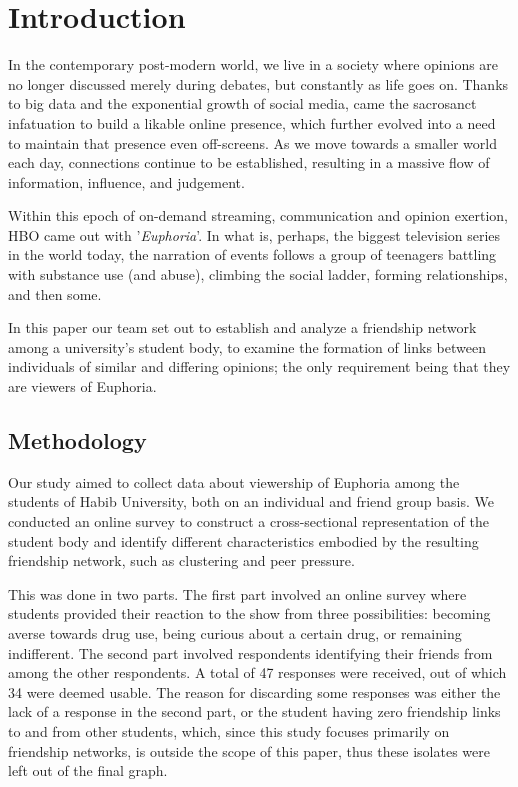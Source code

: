 \documentclass[runningheads]{llncs}
\begin{document}
\section{Introduction}
In the contemporary post-modern world, we live in a society where opinions are no longer discussed merely during debates, but constantly as life goes on. Thanks to big data and the exponential growth of social media, came the sacrosanct infatuation to build a likable online presence, which further evolved into a need to maintain that presence even off-screens. As we move towards a smaller world each day, connections continue to be established, resulting in a massive flow of information, influence, and judgement.

Within this epoch of on-demand streaming, communication and opinion exertion, HBO came out with '\textit{Euphoria}'. In what is, perhaps, the biggest television series in the world today, the narration of events follows a group of teenagers battling with substance use (and abuse), climbing the social ladder, forming relationships, and then some.

In this paper our team set out to establish and analyze a friendship network among a university's student body, to examine the formation of links between individuals of similar and differing opinions; the only requirement being that they are viewers of Euphoria. 

\subsection{Methodology}
Our study aimed to collect data about viewership of Euphoria among the students of Habib University, both on an individual and friend group basis. We conducted an online survey to construct a cross-sectional representation of the student body and identify different characteristics embodied by the resulting friendship network, such as clustering and peer pressure.

This was done in two parts. The first part involved an online survey where students provided their reaction to the show from three possibilities: becoming averse towards drug use, being curious about a certain drug, or remaining indifferent. The second part involved respondents identifying their friends from among the other respondents. A total of 47 responses were received, out of which 34 were deemed usable. The reason for discarding some responses was either the lack of a response in the second part, or the student having zero friendship links to and from other students, which, since this study focuses primarily on friendship networks, is outside the scope of this paper, thus these isolates were left out of the final graph. 
\\
\end{document}
